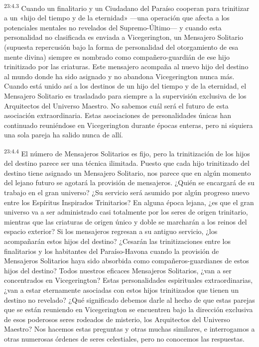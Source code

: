 \par
\textsuperscript{23:4.3} Cuando un finalitario y un Ciudadano del Paraíso cooperan para trinitizar a un «hijo del tiempo y de la eternidad» ---una operación que afecta a los potenciales mentales no revelados del Supremo-Último--- y cuando esta personalidad no clasificada es enviada a Vicegerington, un Mensajero Solitario (supuesta repercusión bajo la forma de personalidad del otorgamiento de esa mente divina) siempre es nombrado como compañero-guardián de ese hijo trinitizado por las criaturas. Este mensajero acompaña al nuevo hijo del destino al mundo donde ha sido asignado y no abandona Vicegerington nunca más. Cuando está unido así a los destinos de un hijo del tiempo y de la eternidad, el Mensajero Solitario es trasladado para siempre a la supervisión exclusiva de los Arquitectos del Universo Maestro. No sabemos cuál será el futuro de esta asociación extraordinaria. Estas asociaciones de personalidades únicas han continuado reuniéndose en Vicegerington durante épocas enteras, pero ni siquiera una sola pareja ha salido nunca de allí.

\par
\textsuperscript{23:4.4} El número de Mensajeros Solitarios es fijo, pero la trinitización de los hijos del destino parece ser una técnica ilimitada. Puesto que cada hijo trinitizado del destino tiene asignado un Mensajero Solitario, nos parece que en algún momento del lejano futuro se agotará la provisión de mensajeros. ¿Quién se encargará de su trabajo en el gran universo? ¿Su servicio será asumido por algún progreso nuevo entre los Espíritus Inspirados Trinitarios? En alguna época lejana, ¿es que el gran universo va a ser administrado casi totalmente por los seres de origen trinitario, mientras que las criaturas de origen único y doble se marcharán a los reinos del espacio exterior? Si los mensajeros regresan a su antiguo servicio, ¿los acompañarán estos hijos del destino? ¿Cesarán las trinitizaciones entre los finalitarios y los habitantes del Paraíso-Havona cuando la provisión de Mensajeros Solitarios haya sido absorbida como compañeros-guardianes de estos hijos del destino? Todos nuestros eficaces Mensajeros Solitarios, ¿van a ser concentrados en Vicegerington? Estas personalidades espirituales extraordinarias, ¿van a estar eternamente asociadas con estos hijos trinitizados que tienen un destino no revelado? ¿Qué significado debemos darle al hecho de que estas parejas que se están reuniendo en Vicegerington se encuentren bajo la dirección exclusiva de esos poderosos seres rodeados de misterio, los Arquitectos del Universo Maestro? Nos hacemos estas preguntas y otras muchas similares, e interrogamos a otras numerosas órdenes de seres celestiales, pero no conocemos las respuestas.

